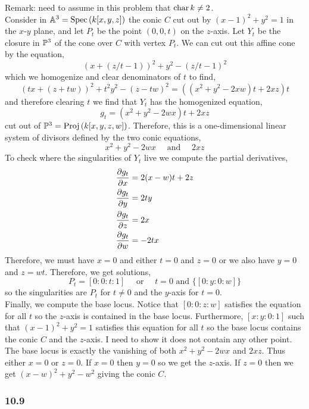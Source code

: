 \documentclass[12pt]{article}
\begin{document}
Remark: need to assume in this problem that $\ch{k} \neq 2$. 
\bigskip\\
Consider in $\A^3 = \Spec{k[x,y,z]}$ the conic $C$ cut out by $(x-1)^2 + y^2 = 1$ in the $x$-$y$ plane, and let $P_t$ be the point $(0,0,t)$ on the $z$-axis. Let $Y_t$ be the closure in $\P^3$ of the cone over $C$ with vertex $P_t$. We can cut out this affine cone by the equation,
\[ (x + (z/t - 1))^2 + y^2 - (z/t - 1)^2 \]
which we homogenize and clear denominators of $t$ to find,
\[ (tx + (z + tw))^2 + t^2 y^2 - (z - t w)^2 = ((x^2 + y^2 - 2 x w)t + 2 x z)t \]
and therefore clearing $t$ we find that $Y_t$ has the homogenized equation,
\[ g_t = (x^2 + y^2 - 2 wx) t + 2 x z  \]
cut out of $\P^3 = \Proj{k[x,y,z,w]}$. Therefore, this is a one-dimensional linear system of divisors defined by the two conic equations,
\[ x^2 + y^2 - 2 w x \quad \text{ and } \quad 2 x z \] 
To check where the singularities of $Y_t$ live we compute the partial derivatives,
\begin{align*}
\pderiv{g_t}{x} & = 2 (x - w) t + 2 z 
\\
\pderiv{g_t}{y} & = 2 t y 
\\
\pderiv{g_t}{z} & = 2 x
\\
\pderiv{g_t}{w} & = -2 t x
\end{align*}
Therefore, we must have $x = 0$ and either $t = 0$ and $z = 0$ or we also have $y = 0$ and $z = w t$. Therefore, we get solutions,
\[ P_t = [0:0:t:1] \quad \text{ or } \quad t = 0 \text{ and } \{ [0:y:0:w] \} \]
so the singularities are $P_t$ for $t \neq 0$ and the $y$-axis for $t = 0$.  
\bigskip\\
Finally, we compute the base locus. Notice that $[0:0:z:w]$ satisfies the equation for all $t$ so the $z$-axis is contained in the base locus. Furthermore, $[x:y:0:1]$ such that $(x-1)^2 + y^2 = 1$ satisfies this equation for all $t$ so the base locus contains the conic $C$ and the $z$-axis. I need to show it does not contain any other point. The base locus is exactly the vanishing of both $x^2 + y^2 - 2 w x$ and $2 x z$. Thus either $x = 0$ or $z = 0$. If $x = 0$ then $y = 0$ so we get the $z$-axis. If $z = 0$ then we get $(x - w)^2 + y^2 - w^2$ giving the conic $C$.

\subsubsection{10.9}
\end{document}
